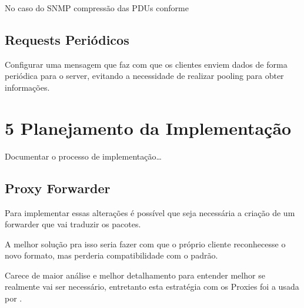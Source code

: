 \documentclass[twoside,english,brazilian]{UNISINOSmonografia}
\begin{document}
		No caso do SNMP compressão das PDUs conforme \cite{Choi2009}
		
		
	\section{Requests Periódicos}
		
		Configurar uma mensagem que faz com que os clientes enviem
		dados de forma periódica para o server, evitando a necessidade
		de realizar pooling para obter informações.
		\cite{Choi2009}
		
		
\chapter{5 Planejamento da Implementação}
	
	Documentar o processo de implementação\ldots
	
	\section{Proxy Forwarder}
		
		Para implementar essas alterações é possível que seja necessária
		a criação de um forwarder que vai traduzir os pacotes.
		
		A melhor solução pra isso seria fazer com que o próprio cliente
		reconhecesse o novo formato, mas perderia compatibilidade com
		o padrão.
		
		Carece de maior análise e melhor detalhamento para entender 
		melhor se realmente vai ser necessário, entretanto esta estratégia
		com os Proxies foi a usada por \cite{Choi2009}.
	
	
	
	



%
\end{document}
